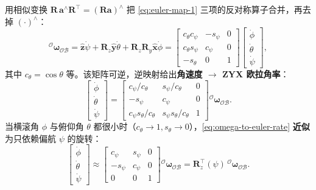 用相似变换 $\mathbf{R}\,\boldsymbol{a}^{\wedge}\mathbf{R}^\top=(\mathbf{R}\boldsymbol{a})^{\wedge}$ 把 \cref{eq:euler-map-1} 三项的反对称算子合并，再去掉 $(\cdot)^\wedge$\cite{yu2021quadruped}：
\begin{equation}
  {}^{\mathcal{O}}\boldsymbol{\omega}_{\mathcal{OB}}
  =\hat{\mathbf{z}}\dot{\psi}+\mathbf{R}_z\hat{\mathbf{y}}\dot{\theta}+\mathbf{R}_z\mathbf{R}_y\hat{\mathbf{x}}\dot{\phi}
  =\begin{bmatrix} c_\theta c_\psi & -s_\psi & 0 \\ c_\theta s_\psi & c_\psi & 0 \\ -s_\theta & 0 & 1 \end{bmatrix}\begin{bmatrix} \dot{\phi} \\ \dot{\theta} \\ \dot{\psi} \end{bmatrix},
  \label{eq:euler-rate-to-omega}
\end{equation}
其中 $c_\theta=\cos\theta$ 等。该矩阵可逆，逆映射给出\textbf{角速度 $\to$ ZYX 欧拉角率}\cite{yu2021quadruped}：
\begin{equation}
  \begin{bmatrix} \dot{\phi} \\ \dot{\theta} \\ \dot{\psi} \end{bmatrix}
  =\begin{bmatrix} c_\psi/c_\theta & s_\psi/c_\theta & 0 \\ -s_\psi & c_\psi & 0 \\ c_\psi s_\theta/c_\theta & s_\psi s_\theta/c_\theta & 1 \end{bmatrix}{}^{\mathcal{O}}\boldsymbol{\omega}_{\mathcal{OB}}.
  \label{eq:omega-to-euler-rate}
\end{equation}
当横滚角 $\phi$ 与俯仰角 $\theta$ 都很小时（$c_\theta\to1,s_\theta\to0$），\cref{eq:omega-to-euler-rate} \textbf{近似}为只依赖偏航 $\psi$ 的旋转\cite{yu2021quadruped,dicarlo2018cheetah}：
\begin{equation}
  \boxed{\begin{bmatrix} \dot{\phi} \\ \dot{\theta} \\ \dot{\psi} \end{bmatrix}
  \approx\begin{bmatrix} c_\psi & s_\psi & 0 \\ -s_\psi & c_\psi & 0 \\ 0 & 0 & 1 \end{bmatrix}{}^{\mathcal{O}}\boldsymbol{\omega}_{\mathcal{OB}}
  =\mathbf{R}_z^\top(\psi)\,{}^{\mathcal{O}}\boldsymbol{\omega}_{\mathcal{OB}}}.
  \label{eq:euler-map-small}
\end{equation}

